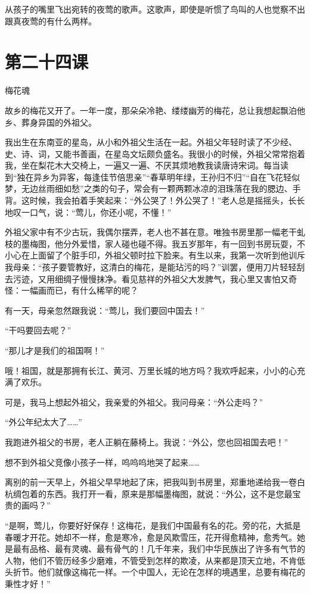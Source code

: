 \documentclass[12pt,UTF8]{ctexbook}
\begin{document}
从孩子的嘴里飞出宛转的夜莺的歌声。这歌声，即使是听惯了鸟叫的人也觉察不出跟真夜莺的有什么两样。

\section{第二十四课}

梅花魂

故乡的梅花又开了。一年一度，那朵朵冷艳、缕缕幽芳的梅花，总让我想起飘泊他乡、葬身异国的外祖父。

我出生在东南亚的星岛，从小和外祖父生活在一起。外祖父年轻时读了不少经、史、诗、词，又能书善画，在星岛文坛颇负盛名。我很小的时候，外祖父常常抱着我，坐在梨花木大交椅上，一遍又一遍、不厌其烦地教我读唐诗宋词。每当读到“独在异乡为异客，每逢佳节倍思亲”“春草明年绿，王孙归不归”“自在飞花轻似梦，无边丝雨细如愁”之类的句子，常会有一颗两颗冰凉的泪珠落在我的腮边、手背。这时候，我会拍着手笑起来：“外公哭了！外公哭了！”老人总是摇摇头，长长地叹一口气，说：“莺儿，你还小呢，不懂！”

外祖父家中有不少古玩，我偶尔摆弄，老人也不甚在意。唯独书房里那一幅老干虬枝的墨梅图，他分外爱惜，家人碰也碰不得。我五岁那年，有一回到书房玩耍，不小心在上面留了个脏手印，外祖父顿时拉下脸来。有生以来，我第一次听到他训斥我母亲：“孩子要管教好，这清白的梅花，是能玷污的吗？”训罢，便用刀片轻轻刮去污迹，又用细绸子慢慢抹净。看见慈祥的外祖父大发脾气，我心里又害怕又奇怪：一幅画而已，有什么稀罕的呢？

有一天，母亲忽然跟我说：“莺儿，我们要回中国去！”

“干吗要回去呢？”

“那儿才是我们的祖国啊！”

哦！祖国，就是那拥有长江、黄河、万里长城的地方吗？我欢呼起来，小小的心充满了欢乐。

可是，我马上想起外祖父，我亲爱的外祖父。我问母亲：“外公走吗？”

“外公年纪太大了……”

我跑进外祖父的书房，老人正躺在藤椅上。我说：“外公，您也回祖国去吧！”

想不到外祖父竞像小孩子一样，呜呜呜地哭了起来……

离别的前一天早上，外祖父早早地起了床，把我叫到书房里，郑重地递给我一卷白杭绸包着的东西。我打开一看，原来是那幅墨梅图，就说：“外公，这不是您最宝贵的画吗？”

“是啊，莺儿，你要好好保存！这梅花，是我们中国最有名的花。旁的花，大抵是春暖才开花。她却不一样，愈是寒冷，愈是风欺雪压，花开得愈精神，愈秀气。她是最有品格、最有灵魂、最有骨气的！几千年来，我们中华民族出了许多有气节的人物，他们不管历经多少磨难，不管受到怎样的欺凌，从来都是顶天立地，不肯低头折节。他们就像这梅花一样。一个中国人，无论在怎样的境遇里，总要有梅花的秉性才好！”
\end{document}
